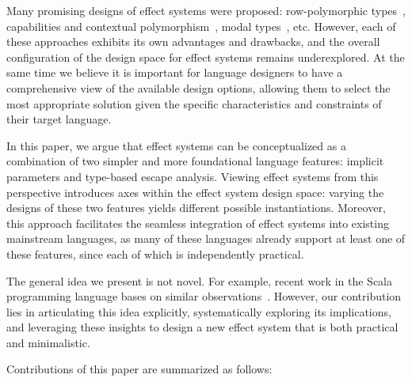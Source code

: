 \documentclass[acmsmall,review,screen]{acmart}
\begin{document}
Many promising designs of effect systems were proposed: row-polymorphic types~\cite{leijen2014koka}, capabilities and contextual polymorphism~\cite{brachthauser2022effects, boruch2023capturing}, modal types~\cite{tang2025modal}, etc.
However, each of these approaches exhibits its own advantages and drawbacks, and the overall configuration of the design space for effect systems remains underexplored.
At the same time we believe it is important for language designers to have a comprehensive view of the available design options, allowing them to select the most appropriate solution given the specific characteristics and constraints of their target language.

In this paper, we argue that effect systems can be conceptualized as a combination of two simpler and more foundational language features: implicit parameters and type-based escape analysis.
Viewing effect systems from this perspective introduces axes within the effect system design space: varying the designs of these two features yields different possible instantiations.
Moreover, this approach facilitates the seamless integration of effect systems into existing mainstream languages, as many of these languages already support at least one of these features, since each of which is independently practical.

The general idea we present is not novel.
For example, recent work in the Scala programming language bases on similar observations~\cite{odersky2021safer, boruch2023capturing}.
However, our contribution lies in articulating this idea explicitly, systematically exploring its implications, and leveraging these insights to design a new effect system that is both practical and minimalistic.


Contributions of this paper are summarized as follows:
\end{document}
